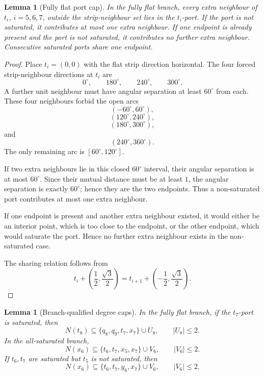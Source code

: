 \documentclass[11pt]{article}
\newtheorem{lemma}[theorem]{Lemma}
\begin{document}
\begin{lemma}[Fully flat port cap]\label{lem:port}
In the fully flat branch, every extra neighbour of $t_i$, $i=5,6,7$, outside the strip-neighbour set lies in the $t_i$-port. If the port is not saturated, it contributes at most one extra neighbour. If one endpoint is already present and the port is not saturated, it contributes no further extra neighbour. Consecutive saturated ports share one endpoint.
\end{lemma}

\begin{proof}
Place $t_i=(0,0)$ with the flat strip direction horizontal. The four forced strip-neighbour directions at $t_i$ are
\[
 0^\circ,
 \qquad 180^\circ,
 \qquad 240^\circ,
 \qquad 300^\circ.
\]
A further unit neighbour must have angular separation at least $60^\circ$ from each. These four neighbours forbid the open arcs
\[
 (-60^\circ,60^\circ),
\]
\[
 (120^\circ,240^\circ),
\]
\[
 (180^\circ,300^\circ),
\]
and
\[
 (240^\circ,360^\circ).
\]
The only remaining arc is $[60^\circ,120^\circ]$.

If two extra neighbours lie in this closed $60^\circ$ interval, their angular separation is at most $60^\circ$. Since their mutual distance must be at least $1$, the angular separation is exactly $60^\circ$; hence they are the two endpoints. Thus a non-saturated port contributes at most one extra neighbour.

If one endpoint is present and another extra neighbour existed, it would either be an interior point, which is too close to the endpoint, or the other endpoint, which would saturate the port. Hence no further extra neighbour exists in the non-saturated case.

The sharing relation follows from
\[
 t_i+\left(\frac12,\frac{\sqrt3}{2}\right)
 =t_{i+1}+\left(-\frac12,\frac{\sqrt3}{2}\right).
\]
\end{proof}

\begin{lemma}[Branch-qualified degree caps]\label{lem:degree-caps}
In the fully flat branch, if the $t_7$-port is saturated, then
\[
 N(t_8)\subseteq\{q_8,q_9,t_7,x_7\}\cup U_8,
 \qquad |U_8|\le2.
\]
In the all-saturated branch,
\[
 N(x_6)\subseteq\{t_6,t_7,x_5,x_7\}\cup V_6,
 \qquad |V_6|\le2.
\]
If $t_6,t_7$ are saturated but $t_5$ is not saturated, then
\[
 N(x_6)\subseteq\{t_6,t_7,y_6,x_7\}\cup V_6,
 \qquad |V_6|\le2.
\]
\end{lemma}
\end{document}
